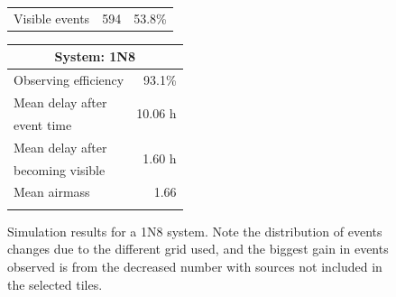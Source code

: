 \begin{colsection}
\begin{colsection}
\begin{figure}[p]
\begin{center}
\begin{minipage}[t]{0.45\textwidth}
\begin{tabular}{lrr}
                \midrule
                Visible events & 594 &  53.8\% \\
            \end{tabular}
        \end{minipage}
        \begin{minipage}[t]{0.37\textwidth}\vspace{0pt}
            \begin{tabular}{lr}
                \multicolumn{2}{c}{\textbf{System: 1N8}} \\
                \midrule
                Observing efficiency & 93.1\% \\
                \midrule
                Mean delay after     & \multirow{2}{*}{10.06 h} \\
                event time           & \\
                Mean delay after     & \multirow{2}{*}{1.60 h} \\
                becoming visible     & \\
                \midrule
                Mean airmass         & 1.66 \\
                & \\
            \end{tabular}
        \end{minipage}
    \end{center}
    \caption[GW simulation results: 1N8 system]{
        Simulation results for a 1N8 system. Note the distribution of events changes due to the different grid used, and the biggest gain in events observed is from the decreased number with sources not included in the selected tiles.
    }\label{fig:gw_sim_1n8}
\end{figure}


\end{colsection}
\end{colsection}
